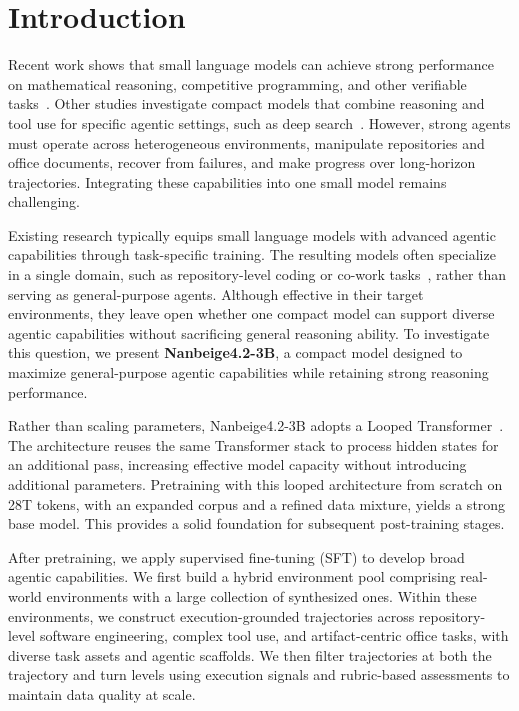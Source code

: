 \section{Introduction}\label{sec:intro}

Recent work shows that small language models can achieve strong performance on mathematical reasoning, competitive programming, and other verifiable tasks~\cite{xu2026vibethinker,yang2025nanbeige4}. Other studies investigate compact models that combine reasoning and tool use for specific agentic settings, such as deep search~\cite{yang2026nanbeige4}. However, strong agents must operate across heterogeneous environments, manipulate repositories and office documents, recover from failures, and make progress over long-horizon trajectories. Integrating these capabilities into one small model remains challenging.

Existing research typically equips small language models with advanced agentic capabilities through task-specific training. The resulting models often specialize in a single domain, such as repository-level coding or co-work tasks~\cite{ivison2026tmax,bai2026clawgym}, rather than serving as general-purpose agents. Although effective in their target environments, they leave open whether one compact model can support diverse agentic capabilities without sacrificing general reasoning ability. To investigate this question, we present \textbf{Nanbeige4.2-3B}, a compact model designed to maximize general-purpose agentic capabilities while retaining strong reasoning performance.

Rather than scaling parameters, 
Nanbeige4.2-3B adopts a Looped Transformer~\cite{bae2026mixture}. The architecture reuses the same Transformer stack to process hidden states for an additional pass, increasing effective model capacity without introducing additional parameters. 
Pretraining with this looped architecture from scratch on 28T tokens, with an expanded corpus and a refined data mixture, yields a strong base model. This provides a solid foundation for subsequent post-training stages.

After pretraining, we apply supervised fine-tuning (SFT) to develop broad agentic capabilities.
We first build a hybrid environment pool comprising real-world environments with a large collection of synthesized ones. 
Within these environments, we construct execution-grounded trajectories across repository-level software engineering, complex tool use, and artifact-centric office tasks, with diverse task assets and agentic scaffolds.
We then filter trajectories at both the trajectory and turn levels using execution signals and rubric-based assessments to maintain data quality at scale.


